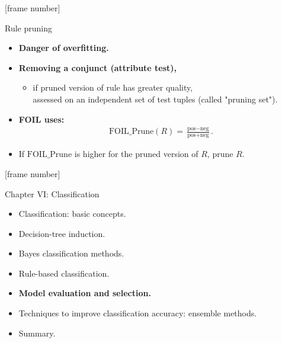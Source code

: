 \documentclass[aspectratio=169,t,table]{beamer}
\begin{document}
  {
    [frame number]
    \begin{frame}{Rule pruning}
      \begin{itemize}
        \item \textbf{Danger of {\color{airforceblue}overfitting}.}
        \item \textbf{Removing a conjunct (attribute test),}
        \begin{itemize}
          \item if pruned version of rule has greater quality,\\
                assessed on an independent set of test tuples (called "pruning set").
        \end{itemize}
        \item \textbf{FOIL uses:}
              \begin{align}
                \text{FOIL\_Prune}(R) = \frac{\text{pos}-\text{neg}}{\text{pos}+\text{neg}}.
              \end{align}
        \item If $\text{FOIL\_Prune}$ is higher for the pruned version of $R$, prune $R$.
      \end{itemize}
    \end{frame}
  }

  {
    [frame number]
    \begin{frame}{Chapter VI: Classification}
        \begin{itemize}
            \item Classification: basic concepts.
            \item Decision-tree induction.
            \item Bayes classification methods.
            \item Rule-based classification.
            \item \textbf{Model evaluation and selection.}
            \item Techniques to improve classification accuracy: ensemble methods.
            \item Summary.
        \end{itemize}
    \end{frame}
  }
\end{document}
